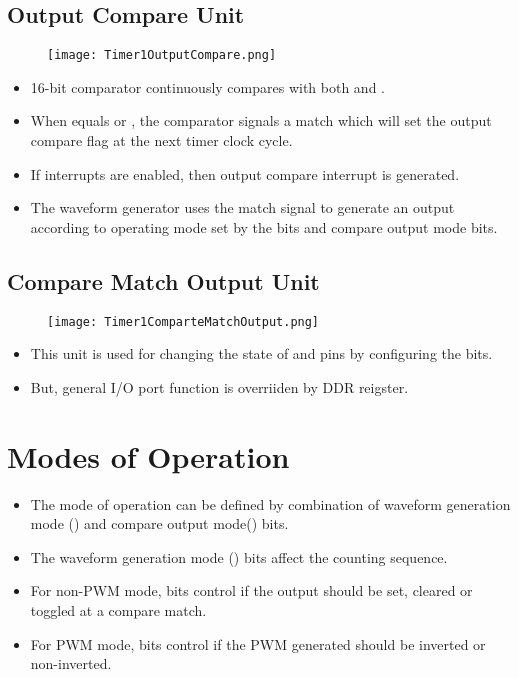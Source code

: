 \subsection{Output Compare Unit}
\begin{figure}[H]
    \begin{center}
        \texttt{[image: Timer1OutputCompare.png]}
    \end{center}
\end{figure}
\begin{itemize}
    \item 16-bit comparator continuously compares  with both  and .
    \item When  equals  or , the comparator signals a match which will set the output compare flag at the next timer clock cycle.
    \item If interrupts are enabled, then output compare interrupt is generated.
    \item The waveform generator uses the match signal to generate an output according to operating mode set by the  bits and compare output mode  bits.
\end{itemize}

\subsection{Compare Match Output Unit}
\begin{figure}[H]
    \begin{center}
        \texttt{[image: Timer1ComparteMatchOutput.png]}
    \end{center}
\end{figure}
\begin{itemize}
    \item This unit is used for changing the state of  and  pins by configuring the  bits.
    \item But, general I/O port function is overriiden by DDR reigster.
\end{itemize}


\section{Modes of Operation}
\begin{itemize}
    \item The mode of operation can be defined by combination of waveform generation mode () and compare output mode() bits.
    \item The waveform generation mode () bits affect the counting sequence.
    \item For non-PWM mode,  bits control if the output should be set, cleared or toggled at a compare match.
    \item For PWM mode,  bits control if the PWM generated should be inverted or non-inverted.
\end{itemize}



